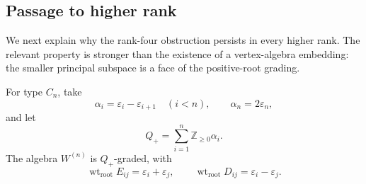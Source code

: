 \documentclass[11pt]{amsart}
\theoremstyle{definition}
\theoremstyle{remark}
\newtheorem{remark}[theorem]{Remark}
\DeclareMathOperator{\gr}{gr}
\begin{document}

\subsection{Passage to higher rank}

We next explain why the rank-four obstruction persists in every
higher rank. The relevant property is stronger than the existence
of a vertex-algebra embedding: the smaller principal subspace is
a face of the positive-root grading.

For type \(C_n\), take
\[
\alpha_i=\varepsilon_i-\varepsilon_{i+1}\quad(i<n),
\qquad
\alpha_n=2\varepsilon_n,
\]
and let
\[
Q_+=\sum_{i=1}^n\mathbb Z_{\geq0}\alpha_i.
\]
The algebra \(W^{(n)}\) is \(Q_+\)-graded, with
\[
\operatorname{wt}_{\mathrm{root}}E_{ij}
=\varepsilon_i+\varepsilon_j,
\qquad
\operatorname{wt}_{\mathrm{root}}D_{ij}
=\varepsilon_i-\varepsilon_j.
\]
\end{document}
